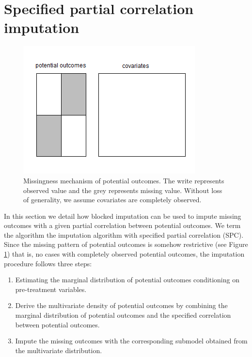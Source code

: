 	\section{Specified partial correlation imputation}
	\label{sec:4.4}
	\begin{figure}[ht!]
		\centering
		\includegraphics[width=1.0\linewidth,height=0.5\textheight]{plots/potentialoutcome} 
		\caption{Missingness mechanism of potential outcomes. The write represents observed value and the grey represents missing value. Without loss of generality, we assume covariates are completely observed.}
		\label{fig4_1}
	\end{figure}
	
	In this section we detail how blocked imputation can be used to impute missing outcomes with a given partial correlation between potential outcomes. We term the algorithm the imputation algorithm with specified partial correlation (SPC). Since the missing pattern of potential outcomes is somehow restrictive (see Figure \ref{fig4_1}) that is, no cases with completely observed potential outcomes, the imputation procedure follows three steps: 
	
	\begin{enumerate}
		\item Estimating the marginal distribution of potential outcomes conditioning on pre-treatment variables. 
		\item Derive the multivariate density of potential outcomes by combining the marginal distribution of potential outcomes and the specified correlation between potential outcomes. 
		\item Impute the missing outcomes with the corresponding submodel obtained from the multivariate distribution. 
	\end{enumerate}	
	
